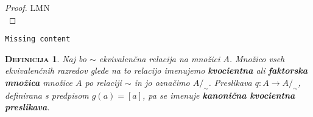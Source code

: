\documentclass[a4paper,12pt]{article}
\newtheorem*{definicija}{\textsc{Definicija}}
\begin{document}
\begin{proof}
LMN \\
\end{proof}

\texttt{Missing content} \\

\begin{definicija}
Naj bo $\sim$ ekvivalenčna relacija na množici $A$. Množico vseh ekvivalenčnih \linebreak  razredov glede na to relacijo imenujemo \textbf{kvocientna} ali \textbf{faktorska množica} množice $A$ po relaciji $\sim$ in jo označimo $A/_\sim$. Preslikava $q:A\to A/_\sim$, definirana s predpisom $g(a)=[a]$, pa se imenuje \textbf{kanonična kvocientna preslikava}. \\
\end{definicija}

\newpage 
\end{document}
